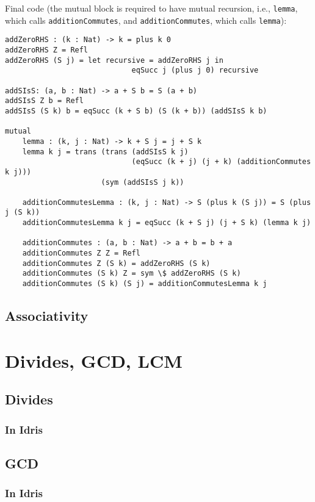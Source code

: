 \documentclass{article}
\newcommand{\inline}[1]{\texttt{#1}}
\begin{document}
Final code (the mutual block is required to have mutual recursion, i.e., \inline{lemma}, which calls \inline{additionCommutes}, and \inline{additionCommutes}, which calls \inline{lemma}):

\begin{verbatim}
addZeroRHS : (k : Nat) -> k = plus k 0
addZeroRHS Z = Refl
addZeroRHS (S j) = let recursive = addZeroRHS j in
                             eqSucc j (plus j 0) recursive

addSIsS: (a, b : Nat) -> a + S b = S (a + b)
addSIsS Z b = Refl
addSIsS (S k) b = eqSucc (k + S b) (S (k + b)) (addSIsS k b)

mutual
    lemma : (k, j : Nat) -> k + S j = j + S k
    lemma k j = trans (trans (addSIsS k j)
                             (eqSucc (k + j) (j + k) (additionCommutes k j)))
                      (sym (addSIsS j k))

    additionCommutesLemma : (k, j : Nat) -> S (plus k (S j)) = S (plus j (S k))
    additionCommutesLemma k j = eqSucc (k + S j) (j + S k) (lemma k j)

    additionCommutes : (a, b : Nat) -> a + b = b + a
    additionCommutes Z Z = Refl
    additionCommutes Z (S k) = addZeroRHS (S k)
    additionCommutes (S k) Z = sym \$ addZeroRHS (S k)
    additionCommutes (S k) (S j) = additionCommutesLemma k j
\end{verbatim}

\subsection{Associativity}

\section{Divides, GCD, LCM}
\subsection{Divides}
\subsubsection{In Idris}

\subsection{GCD}
\subsubsection{In Idris}
\end{document}
